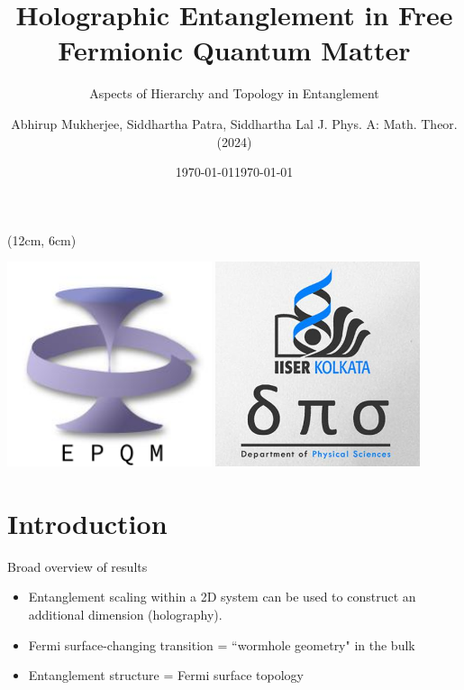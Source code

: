 \documentclass[12pt,aspectratio=169]{beamer}
\title{
	{Holographic Entanglement in Free Fermionic Quantum Matter}
}
\subtitle{Aspects of Hierarchy and Topology in Entanglement}
\date{\today}
\author{Abhirup Mukherjee, Siddhartha Patra, Siddhartha Lal \linebreak
\alert{J. Phys. A: Math. Theor. (2024)}}
\institute{Department of Physical Sciences, IISER Kolkata Mohanpur}
\date{\today}
\begin{document}
\centering
\begin{frame}
\maketitle
\begin{textblock*}{0.25\textwidth}(12cm, 6cm)
	\centering
	\vspace*{\fill}

	\includegraphics[width=0.45\textwidth]{figures/epqm_logo_mod.jpeg}
	\hspace*{\fill}
	\includegraphics[width=0.45\textwidth]{figures/dps_logo.jpeg}

	\vspace*{\fill}
\end{textblock*}
\end{frame}

\section{Introduction}

\begin{frame}{Broad overview of results}
	\begin{itemize}
		\item Entanglement scaling within a 2D system can be used to construct an additional dimension (\alert{holography}).\\[10pt]
		\item Fermi surface-changing transition = ``\alert{wormhole geometry}" in the bulk\\[10pt]
		\item Entanglement structure = Fermi surface topology
	\end{itemize}
\end{frame}
\end{document}
